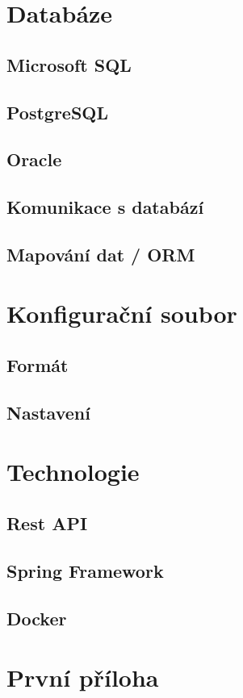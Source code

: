 \documentclass[czech, kiv, ba, he, iso690alph, pdf]{fasthesis}
\begin{document}
\chapter{Databáze}
\section{Microsoft SQL}
\section{PostgreSQL}
\section{Oracle}
\section{Komunikace s databází}
\section{Mapování dat / ORM}

\chapter{Konfigurační soubor}
\section{Formát}
\section{Nastavení}

\chapter{Technologie}
\section{Rest API}
\section{Spring Framework}
\section{Docker}




\appendix
\chapter{První příloha}
\backmatter
\printbibliography
\setbackpageqrcode
\backpage
\end{document}
